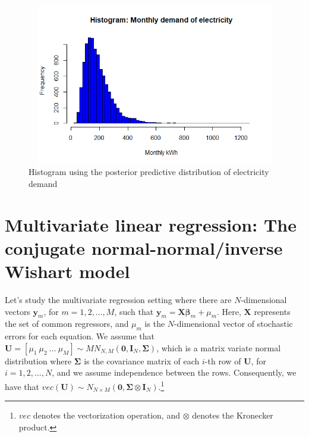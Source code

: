 \begin{figure}[!h]
	\includegraphics[width=340pt, height=200pt]{Chapters/chapter4/figures/PredDemElect.png}
	\caption[List of figure caption goes here]{Histogram using the posterior predictive distribution of electricity demand}\label{fig41}
\end{figure}

 
\section{Multivariate linear regression: The conjugate normal-normal/inverse Wishart model}\label{sec44}

Let's study the multivariate regression setting where there are $N$-dimensional vectors ${\bm{y}}_m$, for $m = 1, 2, \dots, M$, such that ${\bm{y}}_m = {\bm{X}} \bm{\beta}_m + \mu_m$. Here, ${\bm{X}}$ represents the set of common regressors, and $\mu_m$ is the $N$-dimensional vector of stochastic errors for each equation. We assume that ${\bm{U}} = [\mu_1 \ \mu_2 \ \dots \ \mu_M] \sim MN_{N,M}({\bm{0}}, {\bm{I}}_N, {\bm{\Sigma}})$, which is a matrix variate normal distribution where $\bm{\Sigma}$ is the covariance matrix of each $i$-th row of ${\bm{U}}$, for $i = 1, 2, \dots, N$, and we assume independence between the rows. Consequently, we have that $vec({\bm{U}}) \sim N_{N \times M}({\bm{0}}, \bm{\Sigma} \otimes {\bm{I}}_N)$.\footnote{$vec$ denotes the vectorization operation, and $\otimes$ denotes the Kronecker product.}

